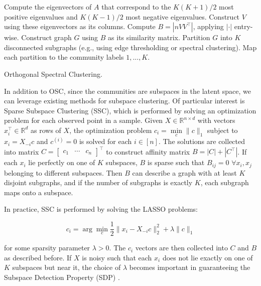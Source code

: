 \documentclass[
  11pt,
]{article}
\begin{document}
\begin{algorithm}[t]
  \DontPrintSemicolon
  \SetAlgoLined
    Compute the eigenvectors of $A$ that correspond to the $K (K+1) / 2$ most 
    positive eigenvalues and $K (K-1) / 2$ most negative eigenvalues. Construct 
    $V$ using these eigenvectors as its columns.\;
    Compute $B = |n V V^\top|$, applying $|\cdot|$ entry-wise.\;
    Construct graph $G$ using $B$ as its similarity matrix.\;
    Partition $G$ into $K$ disconnected subgraphs  
    (e.g., using edge thresholding or spectral clustering).\;
    Map each partition to the community labels $1, ..., K$.\;
  \caption{Orthogonal Spectral Clustering.}
\end{algorithm}

In addition to OSC, since the communities are subspaces in the latent
space, we can leverage existing methods for subspace clustering. Of
particular interest is Sparse Subspace Clustering (SSC), which is
performed by solving an optimization problem for each observed point in
a sample. Given \(X \in \mathbb{R}^{n \times d}\) with vectors
\(x_i^\top \in \mathbb{R}^d\) as rows of \(X\), the optimization problem
\(c_i = \min\limits_{c} \|c\|_1\) subject to \(x_i = X_{-i} c\) and
\(c^{(i)} = 0\) is solved for each \(i \in [n]\). The solutions are
collected into matrix
\(C = \begin{bmatrix} c_1 & \cdots & c_n \end{bmatrix}^\top\) to
construct affinity matrix \(B = |C| + |C^\top|\). If each \(x_i\) lie
perfectly on one of \(K\) subspaces, \(B\) is sparse such that
\(B_{ij} = 0\) \(\forall x_i, x_j\) belonging to different subspaces.
Then \(B\) can describe a graph with at least \(K\) disjoint subgraphs,
and if the number of subgraphs is exactly \(K\), each subgraph maps onto
a subspace.

In practice, SSC is performed by solving the LASSO problems:

\begin{equation} \label{eq:ssc}
c_i = \arg\min_c \frac{1}{2} \|x_i - X_{-i} c \|_2^2 + \lambda \|c\|_1
\end{equation}

for some sparsity parameter \(\lambda > 0\). The \(c_i\) vectors are
then collected into \(C\) and \(B\) as described before. If \(X\) is
noisy such that each \(x_i\) does not lie exactly on one of \(K\)
subspaces but near it, the choice of \(\lambda\) becomes important in
guaranteeing the Subspace Detection Property (SDP)
\cite{jmlr-v28-wang13}.
\end{document}
